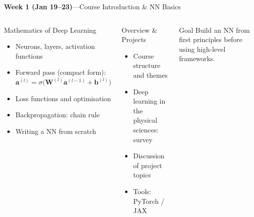 \documentclass[aspectratio=169,11pt]{beamer}
\begin{document}
\begin{frame}{{\color{mlgold}\textbf{Week 1 (Jan 19--23)}\;---\;Course Introduction \& NN Basics}}
  \begin{columns}[T]
      \begin{block}{Mathematics of Deep Learning}
        \begin{itemize}\itemsep1pt
          \item Neurons, layers, activation functions
          \item Forward pass (compact form):\\
                $\bm{a}^{(l)} = \sigma\!\bigl(\bm{W}^{(l)}\bm{a}^{(l-1)}+\bm{b}^{(l)}\bigr)$
          \item Loss functions and optimisation
          \item Backpropagation: chain rule
          \item Writing a NN from scratch
        \end{itemize}
      \end{block}
      \begin{block}{Overview \& Projects}
        \begin{itemize}\itemsep2pt
          \item Course structure and themes
          \item Deep learning in the physical sciences: survey
          \item Discussion of project topics
          \item Tools: PyTorch / JAX
        \end{itemize}
      \end{block}
      \vspace{3pt}
      \begin{alertblock}{Goal}
        Build an NN from first principles
        before using high-level frameworks.
      \end{alertblock}
  \end{columns}
\end{frame}
\end{document}
